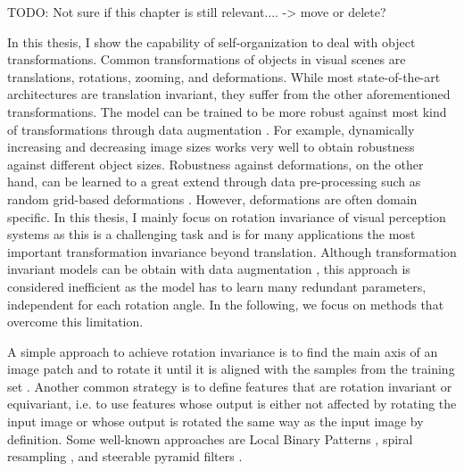TODO: Not sure if this chapter is still relevant.... -> move or delete?

In this thesis, I show the capability of self-organization to deal with object transformations.
Common transformations of objects in visual scenes are translations, rotations, zooming, and deformations.
While most state-of-the-art architectures are translation invariant, they suffer from the other aforementioned transformations.
The model can be trained to be more robust against most kind of transformations through data augmentation .
For example, dynamically increasing and decreasing image sizes works very well to obtain robustness against different object sizes.
Robustness against deformations, on the other hand, can be learned to a great extend through data pre-processing such as random grid-based deformations .
However, deformations are often domain specific.
In this thesis, I mainly focus on rotation invariance of visual perception systems as this is a challenging task and is for many applications the most important transformation invariance beyond translation.
Although transformation invariant models can be obtain with data augmentation \cite{Simard_Steinkraus_Platt_2003, Fasel_Gatica_Perez_2006}, this approach is considered inefficient as the model has to learn many redundant parameters, independent for each rotation angle.
In the following, we focus on methods that overcome this limitation.

A simple approach to achieve rotation invariance is to find the main axis of an image patch and to rotate it until it is aligned with the samples from the training set .
Another common strategy is to define features that are rotation invariant or equivariant, i.e. to use features whose output is either not affected by rotating the input image or whose output is rotated the same way as the input image by definition.
Some well-known approaches are Local Binary Patterns , spiral resampling , and steerable pyramid filters .

